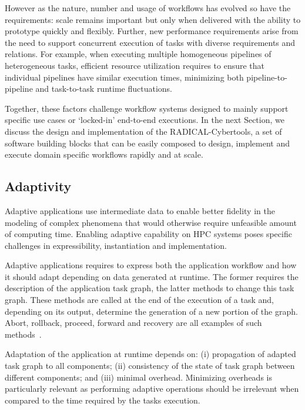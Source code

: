 \documentclass[conference]{IEEEtran}
\begin{document}
However as the nature, number and usage of workflows has evolved so have the
requirements: scale remains important but only when delivered with the
ability to prototype quickly and flexibly. Further, new performance
requirements arise from the need to support concurrent execution of tasks
with diverse requirements and relations. For example, when executing multiple
homogeneous pipelines of heterogeneous tasks, efficient resource utilization
requires to ensure that individual pipelines have similar execution times,
minimizing both pipeline-to-pipeline and task-to-task runtime fluctuations.

Together, these factors challenge workflow systems designed to mainly support
specific use cases or `locked-in' end-to-end executions. In the next Section,
we discuss the design and implementation of the RADICAL-Cybertools, a set of
software building blocks that can be easily composed to design, implement and
execute domain specific workflows rapidly and at scale.

\subsection{Adaptivity}

Adaptive applications use intermediate data to enable better fidelity in the
modeling of complex phenomena that would otherwise require unfeasible amount
of computing time. Enabling adaptive capability on HPC systems poses specific
challenges in expressibility, instantiation and implementation.

Adaptive applications requires to express both the application workflow and
how it should adapt depending on data generated at runtime. The former
requires the description of the application task graph, the latter methods to
change this task graph. These methods are called at the end of the execution
of a task and, depending on its output, determine the generation of a new
portion of the graph. Abort, rollback, proceed, forward and recovery are all
examples of such methods~\cite{van2000dealing}.

Adaptation of the application at runtime depends on: (i) propagation of
adapted task graph to all components; (ii) consistency of the state of task
graph between different components; and (iii) minimal overhead. Minimizing
overheads is particularly relevant as performing adaptive operations should
be irrelevant when compared to the time required by the tasks execution.
\end{document}
